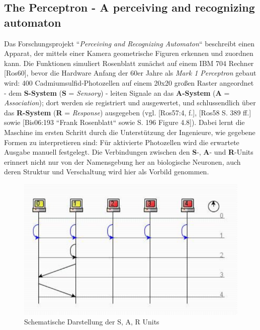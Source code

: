 \subsection*{The Perceptron - A perceiving and recognizing automaton}
Das Forschungsprojekt ``\textit{Perceiving and Recognizing Automaton}`` beschreibt einen Apparat, der mittels einer Kamera geometrische Figuren erkennen und zuordnen kann.
Die Funktionen simuliert Rosenblatt zunächst auf einem IBM 704 Rechner [Ros60], bevor  die Hardware Anfang der 60er Jahre als \textit{Mark 1 Perceptron} gebaut wird: 400 Cadmiumsulfid-Photozellen auf einem 20x20 großen Raster angeordnet - dem \textbf{S-System} (\textbf{S} = \textit{Sensory}) - leiten Signale an das \textbf{A-System} (\textbf{A} = \textit{Association}); dort werden sie registriert und ausgewertet, und schlussendlich über das \textbf{R-System} (\textbf{R} = \textit{Response}) ausgegeben (vgl. [Ros57:4, f.], [Ros58 S. 389 ff.] sowie [Bis06:193 ``Frank Rosenblatt`` sowie S. 196 Figure 4.8]).
Dabei lernt die Maschine im ersten Schritt durch die Unterstützung der Ingenieure, wie gegebene Formen zu interpretieren sind: Für aktivierte Photozellen wird die erwartete Ausgabe manuell festgelegt.
Die Verbindungen zwischen den \textbf{S}-, \textbf{A}- und \textbf{R}-Units erinnert nicht nur von der Namensgebung her an biologische Neuronen, auch deren Struktur und Verschaltung wird hier als Vorbild genommen.



\begin{figure}[h]
    \centering
    \includegraphics{images/p1ReadSeq.pdf}
    \caption{Schematische Darstellung der S, A, R Units}
    \label{fig-sarunits}
\end{figure}

